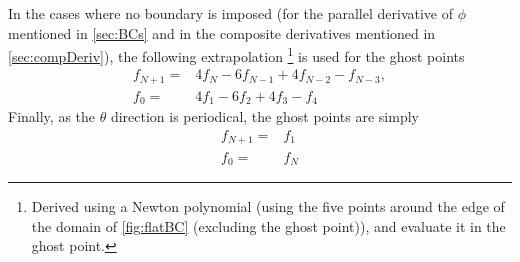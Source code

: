 %
In the cases where no boundary is imposed (for the parallel derivative of $\phi$ mentioned in \cref{sec:BCs} and in the composite derivatives mentioned in \cref{sec:compDeriv}), the following extrapolation %
%
\footnote{
Derived using a Newton polynomial (using the five points around the edge of the domain of \cref{fig:flatBC} (excluding the ghost point)), and evaluate it in the ghost point.
}%
is used for the ghost points
%
\begin{align}
    f_{N+1} =& 4f_{N} - 6f_{N-1} + 4f_{N-2} - f_{N-3},
    \label{eq:extraPolUp}
    \\
    f_{0} =& 4f_{1} - 6f_{2} + 4f_{3} - f_{4}
    \label{eq:extraPolDown}
\end{align}
%
Finally, as the $\theta$ direction is periodical, the ghost points are simply
%
\begin{align*}
    f_{N+1} =& f_{1}
    \\
    f_{0} =& f_{N}
\end{align*}
